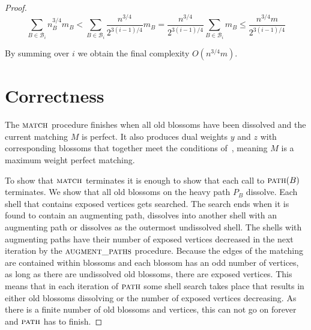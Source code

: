 \begin{proof}

\[\sum_{B \in \mathcal{B}_i} n_B^{3/4}m_B < \sum_{B \in \mathcal{B}_i} \frac{n^{3/4}}{2^{3(i-1)/4}}m_B = \frac{n^{3/4}}{2^{3(i-1)/4}} \sum_{B \in \mathcal{B}_i} m_B \leq \frac{n^{3/4}m}{2^{3(i-1)/4}}\]

By summing over $i$ we obtain the final complexity $O(n^{3/4}m)$.

\section{Correctness}

The $\textsc{match}$ procedure finishes when all old blossoms have been dissolved and the current matching $M$ is perfect. It also produces dual weights $y$ and $z$ with corresponding blossoms that together meet the conditions of~, meaning $M$ is a maximum weight perfect matching.

To show that $\textsc{match}$ terminates it is enough to show that each call to $\textsc{path}(B)$ terminates. We show that all old blossoms on the heavy path $P_B$ dissolve. Each shell that contains exposed vertices gets searched. The search ends when it is found to contain an augmenting path, dissolves into another shell with an augmenting path or dissolves as the outermost undissolved shell. The shells with augmenting paths have their number of exposed vertices decreased in the next iteration by the $\textsc{augment\_paths}$ procedure. Because the edges of the matching are contained within blossoms and each blossom has an odd number of vertices, as long as there are undissolved old blossoms, there are exposed vertices. This means that in each iteration of $\textsc{path}$ some shell search takes place that results in either old blossoms dissolving or the number of exposed vertices decreasing. As there is a finite number of old blossoms and vertices, this can not go on forever and $\textsc{path}$ has to finish.

\end{proof}
